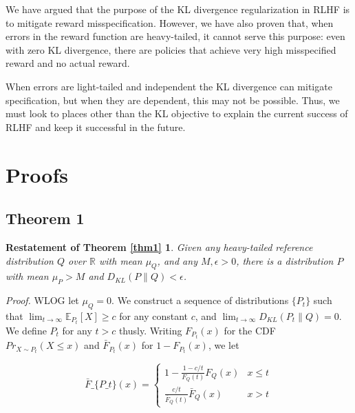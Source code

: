 \documentclass{article}
\begin{document}
We have argued that the purpose of the KL divergence regularization in RLHF is to mitigate reward misspecification. However, we have also proven that, when errors in the reward function are heavy-tailed, it cannot serve this purpose: even with zero KL divergence, there are policies that achieve very high misspecified reward and no actual reward.

When errors are light-tailed and independent the KL divergence can mitigate specification, but when they are dependent, this may not be possible. Thus, we must look to places other than the KL objective to explain the current success of RLHF and keep it successful in the future.


\small{
}



\appendix

\hypertarget{appendix}{%
\section{Proofs}\label{appendix}}

\subsection{Theorem 1}
\newtheorem*{theorem1}{Restatement of Theorem \ref{thm1}}
\begin{theorem1} Given any heavy-tailed reference distribution
\(Q\) over \(\mathbb R\) with mean \(\mu_Q\), and any
\(M, \epsilon > 0\), there is a distribution \(P\) with mean \(\mu_P>M\)
and \(D_{KL}(P \| Q) < \epsilon\).
\end{theorem1}

\emph{Proof.} WLOG let \(\mu_Q = 0\). We construct a sequence of
distributions \(\{P_t\}\) such that
\(\lim_{t \to \infty} \mathbb E_{P_t}[X] \ge c\) for any constant \(c\),
and \(\lim_{t \to \infty} D_{KL}(P_t \| Q) = 0\). We define \(P_t\) for
any \(t > c\) thusly. Writing \(F_{P_t}(x)\) for the CDF
\(Pr_{X \sim P_t}(X \le x)\) and \(\bar F_{P_t}(x)\) for
\(1 - F_{P_t}(x)\), we let

$$ \bar F\_\{P\_t\}(x) =
\begin{cases} 1 - \frac{1 - c/t}{F_Q(t)}F_Q(x) & x \le t
\\ \frac{c/t}{\bar F_Q(t)}\bar F_Q(x) & x > t
\end{cases}
$$
\end{document}
